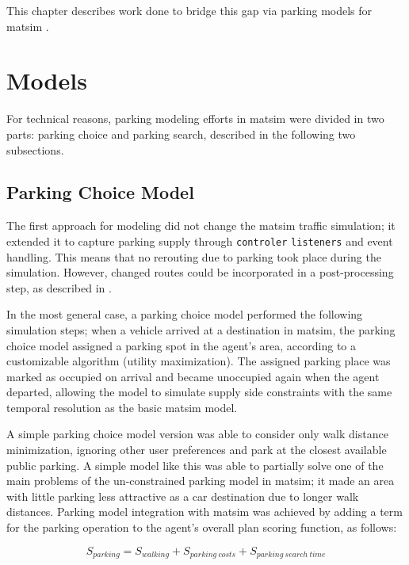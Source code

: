 This chapter describes work done to bridge this gap via parking models for \gls{matsim} .

\section{Models}
For technical reasons, parking modeling efforts in \gls{matsim} were divided in two parts: parking choice and parking search, described in the following two subsections. 

\subsection{Parking Choice Model}
The first approach for modeling did not change the \gls{matsim} traffic simulation; it extended it to capture parking supply through \lstinline|controler| \lstinline|listeners| and event handling. This means that no rerouting due to parking took place during the simulation. However, changed routes could be incorporated in a post-processing step, as described in \citet[][]{WaraichAxhausen_TRR_2012}. 

In the most general case, a parking choice model performed the following simulation steps; when a vehicle arrived at a destination in \gls{matsim}, the parking choice model assigned a parking spot in the agent's area, according to a customizable algorithm (\eg utility maximization). The assigned parking place was marked as occupied on arrival and became unoccupied again when the agent departed, allowing the model to simulate supply side constraints with the same temporal resolution as the basic \gls{matsim} model.

A simple parking choice model version was able to consider only walk distance minimization, ignoring other user preferences and park at the closest available public parking. A simple model like this was able to partially solve one of the main problems of the un-constrained parking model in \gls{matsim}; it made an area with little parking less attractive as a car destination due to longer walk distances. Parking model integration with \gls{matsim} was achieved by adding a term for the parking operation to the agent’s overall plan scoring function, as follows:

\begin{equation}
\label{eq:parkingutf}
S_{parking} = S_{walking} + S_{parking\ costs} + S_{parking\ search\ time}
\end{equation}

